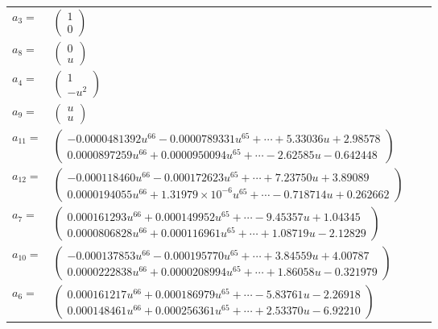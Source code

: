 \documentclass[1p]{elsarticle_modified}
\theoremstyle{definition}
\begin{document}
\begin{tabular}{m{7pt} m{180pt} m{7pt} m{180pt} }
\flushright $a_{3}=$&$\begin{pmatrix}1\\0\end{pmatrix}$ \\
\flushright $a_{8}=$&$\begin{pmatrix}0\\u\end{pmatrix}$ \\
\flushright $a_{4}=$&$\begin{pmatrix}1\\- u^2\end{pmatrix}$ \\
\flushright $a_{9}=$&$\begin{pmatrix}u\\u\end{pmatrix}$ \\
\flushright $a_{11}=$&$\begin{pmatrix}-0.0000481392 u^{66}-0.0000789331 u^{65}+\cdots+5.33036 u+2.98578\\0.0000897259 u^{66}+0.0000950094 u^{65}+\cdots-2.62585 u-0.642448\end{pmatrix}$ \\
\flushright $a_{12}=$&$\begin{pmatrix}-0.000118460 u^{66}-0.000172623 u^{65}+\cdots+7.23750 u+3.89089\\0.0000194055 u^{66}+1.31979\times10^{-6} u^{65}+\cdots-0.718714 u+0.262662\end{pmatrix}$ \\
\flushright $a_{7}=$&$\begin{pmatrix}0.000161293 u^{66}+0.000149952 u^{65}+\cdots-9.45357 u+1.04345\\0.0000806828 u^{66}+0.000116961 u^{65}+\cdots+1.08719 u-2.12829\end{pmatrix}$ \\
\flushright $a_{10}=$&$\begin{pmatrix}-0.000137853 u^{66}-0.000195770 u^{65}+\cdots+3.84559 u+4.00787\\0.0000222838 u^{66}+0.0000208994 u^{65}+\cdots+1.86058 u-0.321979\end{pmatrix}$ \\
\flushright $a_{6}=$&$\begin{pmatrix}0.000161217 u^{66}+0.000186979 u^{65}+\cdots-5.83761 u-2.26918\\0.000148461 u^{66}+0.000256361 u^{65}+\cdots+2.53370 u-6.92210\end{pmatrix}$ \\

\end{tabular}
\end{document}
